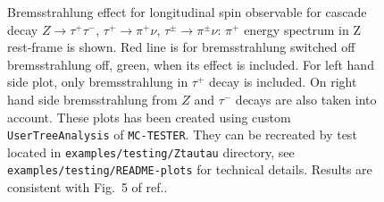 \documentclass[]{Photos_interface_design}
\begin{document}
\begin{figure}[h!]
\centering
{}
\caption{ Bremsstrahlung effect for longitudinal spin observable
for cascade decay $Z \to \tau^+ \tau^-$, $\tau^+ \to \pi^+ \nu$,  $\tau^\pm \to \pi^\pm\nu$:
$\pi^+$ energy spectrum in Z rest-frame  is shown. Red line is for 
bremsstrahlung switched off
bremsstrahlung off, green, when its effect is included. 
For left hand side plot,  only  bremsstrahlung in  $\tau^+ $ decay is included.
On right hand side bremsstrahlung from $Z$ and  $\tau^-$ decays are
 also taken into account.
These plots has been created using custom {\tt UserTreeAnalysis} of {\tt MC-TESTER}.
They can be recreated by  test located in {\tt examples/testing/Ztautau} directory, see  {\tt examples/testing/README-plots} for technical details. Results are 
consistent with Fig.~5 of ref.\cite{Eberhard:1989ve}.
\label{fig:KKMC}
}
\end{figure}
\end{document}
